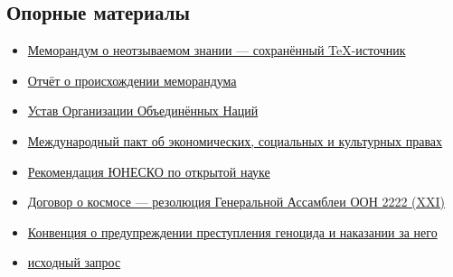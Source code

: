 \documentclass[
  russian,
  11pt,
  a4paper,
]{article}
\providecommand{\tightlist}{%
  \setlength{\itemsep}{0pt}\setlength{\parskip}{0pt}}
\begin{document}
\subsection{Опорные
материалы}\label{ux43eux43fux43eux440ux43dux44bux435-ux43cux430ux442ux435ux440ux438ux430ux43bux44b}

\begin{itemize}
\tightlist
\item
  \href{../источники/меморандум-неотзываемое-знание/memorandum_neotzyvaemoe_znanie.tex}{Меморандум
  о неотзываемом знании --- сохранённый TeX-источник}
\item
  \href{../источники/меморандум-неотзываемое-знание/отчёт-о-происхождении.md}{Отчёт
  о происхождении меморандума}
\item
  \href{https://www.un.org/en/about-us/un-charter/full-text}{Устав
  Организации Объединённых Наций}
\item
  \href{https://www.ohchr.org/Documents/ProfessionalInterest/cescr.pdf}{Международный
  пакт об экономических, социальных и культурных правах}
\item
  \href{https://www.unesco.org/en/legal-affairs/recommendation-open-science}{Рекомендация
  ЮНЕСКО по открытой науке}
\item
  \href{https://docs.un.org/A/RES/2222\%28XXI\%29}{Договор о космосе ---
  резолюция Генеральной Ассамблеи ООН 2222 (XXI)}
\item
  \href{https://www.un.org/en/genocide-prevention/1948-convention}{Конвенция
  о предупреждении преступления геноцида и наказании за него}
\item
  \href{../../запрос.md}{исходный запрос}
\end{itemize}
\end{document}
